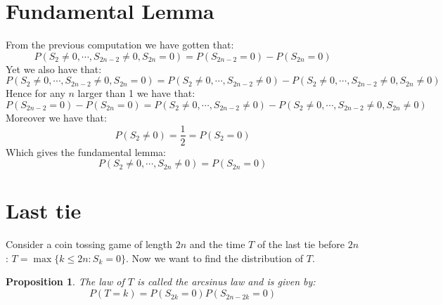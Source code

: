 \documentclass[10pt,a4paper]{book}
\newtheorem{proposition}[section]{Proposition}
\theoremstyle{definition}
\begin{document}
\section{Fundamental Lemma}
From the previous computation we have gotten that:
\[
P(S_2 \neq 0, \cdots, S_{2n - 2}\neq 0, S_{2n} = 0) = P(S_{2n - 2} = 0) - P(S_{2n} = 0)
\]
Yet we also have that:
\[
P(S_2 \neq 0, \cdots, S_{2n - 2}\neq 0, S_{2n} = 0) = P(S_2 \neq 0, \cdots, S_{2n - 2}\neq 0) - P(S_2 \neq 0, \cdots, S_{2n - 2}\neq 0, S_{2n} \neq 0)
\]
Hence for any $n$ larger than 1 we have that:
\[
P(S_{2n - 2} = 0) - P(S_{2n} = 0) = P(S_2 \neq 0, \cdots, S_{2n - 2}\neq 0) - P(S_2 \neq 0, \cdots, S_{2n - 2}\neq 0, S_{2n} \neq 0)
\]
Moreover we have that:
\[
P(S_2 \neq 0 ) = \frac{1}{2} = P(S_2 = 0)
\]
Which gives the fundamental lemma:
\[
P(S_2 \neq 0, \cdots, S_{2n} \neq 0) = P(S_{2n} = 0)
\]

\section{Last tie}
Consider a coin tossing game of length $2n$ and the time $T$ of the last tie before $2n$: $T = \max\{k \leq 2n : S_k = 0\}$. Now we want to find the distribution of $T$. 
\begin{proposition}
The law of $T$ is called the arcsinus law and is given by:
\[
P(T = k) = P(S_{2k} = 0)P(S_{2n - 2k} = 0)
\]
\end{proposition}
\end{document}
